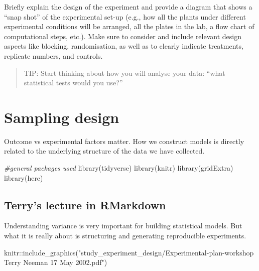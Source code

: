 \documentclass[
]{book}
\newenvironment{Shaded}{\begin{snugshade}}{\end{snugshade}}
\newcommand{\CommentTok}[1]{\textcolor[rgb]{0.56,0.35,0.01}{\textit{#1}}}
\newcommand{\FunctionTok}[1]{\textcolor[rgb]{0.00,0.00,0.00}{#1}}
\newcommand{\NormalTok}[1]{#1}
\newcommand{\SpecialCharTok}[1]{\textcolor[rgb]{0.00,0.00,0.00}{#1}}
\newcommand{\StringTok}[1]{\textcolor[rgb]{0.31,0.60,0.02}{#1}}
\begin{document}
Briefly explain the design of the experiment and provide a diagram that shows a ``snap shot'' of the experimental set-up (e.g., how all the plants under different experimental conditions will be arranged, all the plates in the lab, a flow chart of computational steps, etc.). Make sure to consider and include relevant design aspects like blocking, randomisation, as well as to clearly indicate treatments, replicate numbers, and controls.

\begin{quote}
TIP: Start thinking about how you will analyse your data: ``what statistical tests would you use?''
\end{quote}

\hypertarget{sampling-design}{%
\chapter{Sampling design}\label{sampling-design}}

Outcome vs experimental factors matter. How we construct models is directly related to the underlying structure of the data we have collected.

\begin{Shaded}
\begin{Highlighting}[]
\CommentTok{\#general packages used}
\FunctionTok{library}\NormalTok{(tidyverse)}
\FunctionTok{library}\NormalTok{(knitr)}
\FunctionTok{library}\NormalTok{(gridExtra)}
\FunctionTok{library}\NormalTok{(here)}
\end{Highlighting}
\end{Shaded}

\hypertarget{terrys-lecture-in-rmarkdown}{%
\section{Terry's lecture in RMarkdown}\label{terrys-lecture-in-rmarkdown}}

Understanding variance is very important for building statistical models. But what it is really about is structuring and generating reproducible experiments.

\begin{Shaded}
\begin{Highlighting}[]
\NormalTok{knitr}\SpecialCharTok{::}\FunctionTok{include\_graphics}\NormalTok{(}\StringTok{"study\_experiment\_design/Experimental{-}plan{-}workshop Terry Neeman 17 May 2002.pdf"}\NormalTok{)}
\end{Highlighting}
\end{Shaded}
\end{document}
